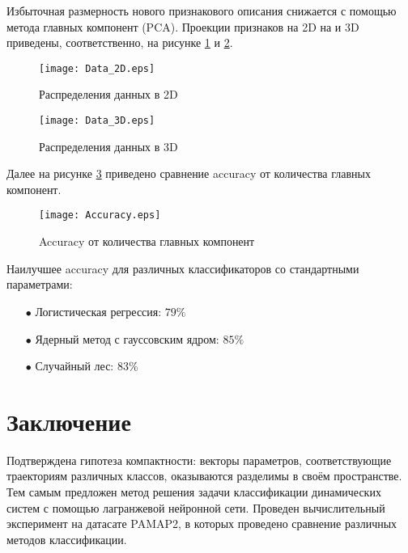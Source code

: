 \documentclass[12pt, twoside]{article}
\begin{document}
        Избыточная размерность нового признакового описания снижается с помощью метода главных компонент (PCA). Проекции признаков на 2D на и 3D приведены, соответственно, на рисунке \ref{fig: 2D} и \ref{fig: 3D}.

        \begin{figure}[H]
            \centering
            \texttt{[image: Data\_2D.eps]}
            \caption{Распределения данных в 2D}
            \label{fig: 2D}
        \end{figure}

        \begin{figure}[H]
            \centering
            \texttt{[image: Data\_3D.eps]}
            \caption{Распределения данных в 3D}
            \label{fig: 3D}
        \end{figure}

        \newpage

        Далее на рисунке \ref{fig: accuracy} приведено сравнение accuracy от количества главных компонент.

        \begin{figure}[H]
            \centering
            \texttt{[image: Accuracy.eps]}
            \caption{Accuracy от количества главных компонент}
            \label{fig: accuracy}
        \end{figure}

        Наилучшее accuracy для различных классификаторов со стандартными параметрами:

        \begin{itemize}

            \item[$\bullet$] Логистическая регрессия: $79\%$

            \item[$\bullet$] Ядерный метод с гауссовским ядром: $85\%$

            \item[$\bullet$] Случайный лес: $83\%$

        \end{itemize}

\section{Заключение}

    Подтверждена гипотеза компактности: векторы параметров, соответствующие траекториям различных классов, оказываются разделимы в своём пространстве. Тем самым предложен метод решения задачи классификации динамических систем с помощью лагранжевой нейронной сети. Проведен вычислительный эксперимент на датасате PAMAP2, в которых проведено сравнение различных методов классификации.

\newpage



\end{document}
